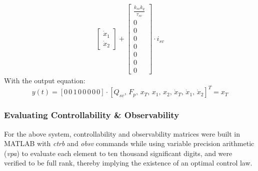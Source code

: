 \documentclass[  10pt, twoside]{report} %
\numberwithin{equation}{chapter}
\begin{document}
\begin{align}
\begin{bmatrix}
        \dot{x}_1 \\[6pt]
        \dot{x}_2
    \end{bmatrix} +
    \begin{bmatrix}
        \frac{k_{sv}k_q}{\tau_{sv}}  \\[6pt]
        0 \\[6pt]
        0 \\[6pt]
        0 \\[6pt]
        0 \\[6pt]
        0 \\[6pt]
        0 \\[6pt]
        0
    \end{bmatrix}
    \cdot i_{sv}
\end{align}
With the output equation:  
\begin{equation}
y(t) = [0\, 0\, 1\, 0\, 0\, 0\, 0\, 0] \cdot [Q_{sv} ,\, F_p ,\, x_T ,\, x_1 ,\, x_2 ,\, \dot{x}_T ,\, \dot{x}_1 ,\, \dot{x}_2 ]^{T} = x_T
\end{equation}

\subsubsection{Evaluating Controllability \& Observability}
For the above system, controllability and observability matrices were built in MATLAB with \emph{ctrb} and \emph{obsv} commands while using variable precision arithmetic (\emph{vpa}) to evaluate each element to ten thousand significant digits, and were verified to be full rank, thereby implying the existence of an optimal control law.
\end{document}
